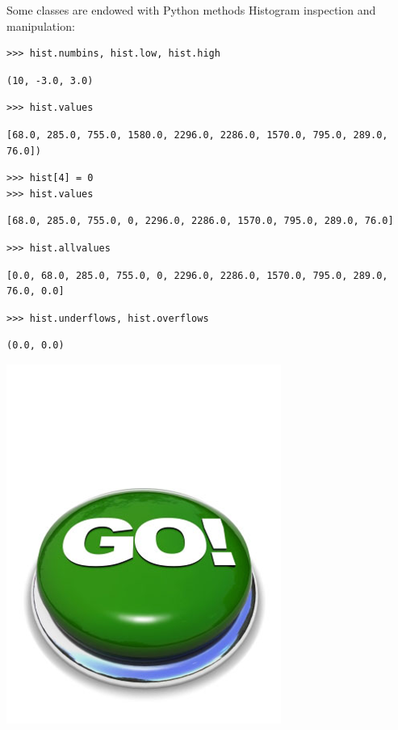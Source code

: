 \documentclass[aspectratio=169]{beamer}
\begin{document}
\begin{frame}[fragile]{Some classes are endowed with Python methods}
\vspace{0.5 cm}
Histogram inspection and manipulation:
\small
\begin{verbatim}
>>> hist.numbins, hist.low, hist.high
\end{verbatim}
\begin{verbatim}
(10, -3.0, 3.0)
\end{verbatim}
\begin{verbatim}
>>> hist.values
\end{verbatim}
\begin{verbatim}
[68.0, 285.0, 755.0, 1580.0, 2296.0, 2286.0, 1570.0, 795.0, 289.0, 76.0])
\end{verbatim}
\begin{verbatim}
>>> hist[4] = 0
>>> hist.values
\end{verbatim}
\begin{verbatim}
[68.0, 285.0, 755.0, 0, 2296.0, 2286.0, 1570.0, 795.0, 289.0, 76.0]
\end{verbatim}
\begin{verbatim}
>>> hist.allvalues
\end{verbatim}
\begin{verbatim}
[0.0, 68.0, 285.0, 755.0, 0, 2296.0, 2286.0, 1570.0, 795.0, 289.0, 76.0, 0.0]
\end{verbatim}
\begin{verbatim}
>>> hist.underflows, hist.overflows
\end{verbatim}
\begin{verbatim}
(0.0, 0.0)
\end{verbatim}

\vspace{-7 cm}
\hfill \includegraphics[width=1.5 cm]{safe.png}\hspace{-0.9 cm}
\vspace{7 cm}
\end{frame}
\end{document}

